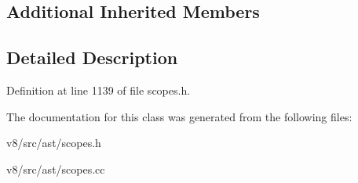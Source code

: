 \subsection*{Additional Inherited Members}


\subsection{Detailed Description}


Definition at line 1139 of file scopes.\+h.



The documentation for this class was generated from the following files\+:\begin{DoxyCompactItemize}
\item 
v8/src/ast/scopes.\+h\item 
v8/src/ast/scopes.\+cc\end{DoxyCompactItemize}
